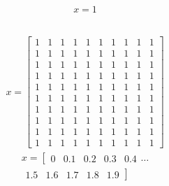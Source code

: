 \documentclass[a4paper,english]{article}
\begin{document}
\begin{equation}\begin{split}
x  = 1
\end{split}\end{equation}


\begin{lstlisting}[language={python}]

\end{lstlisting}
\begin{equation}\begin{split}
x  = \begin{bmatrix}
1 & 1 & 1 & 1 & 1 & 1 & 1 & 1 & 1 & 1
\\
1 & 1 & 1 & 1 & 1 & 1 & 1 & 1 & 1 & 1
\\
1 & 1 & 1 & 1 & 1 & 1 & 1 & 1 & 1 & 1
\\
1 & 1 & 1 & 1 & 1 & 1 & 1 & 1 & 1 & 1
\\
1 & 1 & 1 & 1 & 1 & 1 & 1 & 1 & 1 & 1
\\
1 & 1 & 1 & 1 & 1 & 1 & 1 & 1 & 1 & 1
\\
1 & 1 & 1 & 1 & 1 & 1 & 1 & 1 & 1 & 1
\\
1 & 1 & 1 & 1 & 1 & 1 & 1 & 1 & 1 & 1
\\
1 & 1 & 1 & 1 & 1 & 1 & 1 & 1 & 1 & 1
\\
1 & 1 & 1 & 1 & 1 & 1 & 1 & 1 & 1 & 1
\end{bmatrix}
\end{split}\end{equation}
\begin{equation}\begin{split}
x  = \left[ \begin{array}{ccccc}
0 & 0.1 & 0.2 & 0.3 & 0.4
\end{array} \right.  \ldots \\
\left. \begin{array}{ccccc}
1.5 & 1.6 & 1.7 & 1.8 & 1.9
\end{array} \right]
\end{split}\end{equation}
\end{document}
